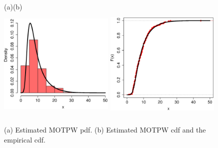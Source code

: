 \documentclass[12pt]{article}
\begin{document}
	\begin{figure}[!htb]
		\begin{center}
			(a)\hspace{5cm}(b)\\					
			\includegraphics[width=5.5cm,height=5.5cm]{Ajuste_marginal_dens_estimada.eps}
			\includegraphics[width=5.5cm,height=5.5cm]{Ajuste_marginal_acum_estimada.eps}
			\caption{(a) Estimated MOTPW pdf. (b) Estimated MOTPW cdf and the empirical cdf.\label{dens_salario}}
		\end{center}
	\end{figure}
	
\end{document}
